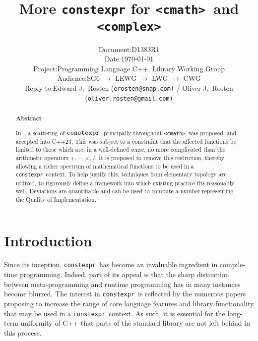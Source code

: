 \documentclass[prd,twocolumn,amsmath,amssymb,nofootinbib,eqsecnum]{revtex4-1}
\newcommand{\constexpr}{\code{constexpr}\xspace}
\newcommand{\code}[1]{{\tt #1}}
\newcommand{\header}[1]{{\tt <#1>}}
\newcommand{\cmath}{\header{cmath}}
\newcommand{\complex}{\header{complex}}
\newcommand{\Operators}{\ensuremath{+,-,\times,/}}
\begin{document}
\title{More \constexpr for \cmath\ and \complex}

\author{
\hspace{11.5em}
\begin{tabular}{ll}
	Document: & D1383R1
\\
	Date: & \today
\\
	Project: & Programming Language C++, Library Working Group
\\
	Audience: & SG6 $\rightarrow$ LEWG $\rightarrow$ LWG $\rightarrow$ CWG
\\
	Reply to: & Edward J.\ Rosten {(\tt erosten@snap.com)}
 / Oliver J.\ Rosten {(\tt oliver.rosten@gmail.com)}
\end{tabular}
}

\begin{abstract}

\begin{center} {\bf Abstract} \end{center}

In~\cite{Rosten-constexpr}, a scattering of $\constexpr$, principally throughout \cmath, was proposed, and accepted into C++23. This was subject to a constraint that the affected functions be limited to those which are, in a well-defined sense, no more complicated than the arithmetic operators \Operators. It is proposed to remove this restriction, thereby allowing a richer spectrum of mathematical functions to be used in a \constexpr\ context. To help justify this, techniques from elementary topology are
utilized, to rigorously define a framework into which existing practice fits reasonably well. Deviations are
quantifiable and can be used to compute a number representing the Quality of Implementation.
	
\end{abstract}


\maketitle
\tableofcontents

\section{Introduction}

Since its inception, \constexpr\ has become an invaluable ingredient in compile-time programming. Indeed, part of its appeal is that the sharp distinction between meta-programming and runtime programming has in many instances become blurred. The interest in \constexpr\ is reflected by the numerous papers proposing to increase the range of core language features and library functionality that may be used in a \constexpr\ context. As such, it is essential for the long-term uniformity of C++ that parts of the standard library are not left behind in this process.
\end{document}
